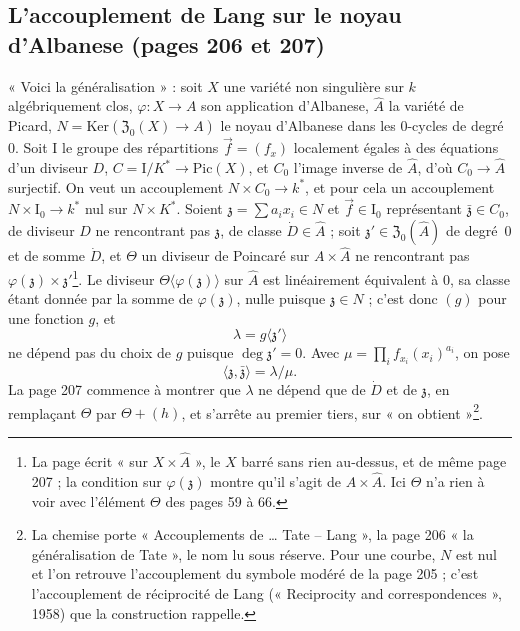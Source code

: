 \documentclass[11pt,a4paper]{article}
\begin{document}
\subsection*{L'accouplement de Lang sur le noyau d'Albanese (pages 206 et 207)}

« Voici la généralisation » : soit $X$ une variété non singulière sur $k$
algébriquement clos, $\varphi : X \to A$ son application d'Albanese, $\hat A$ la
variété de Picard, $N = \mathrm{Ker}(\mathfrak{Z}_0(X) \to A)$ le noyau d'Albanese
dans les $0$-cycles de degré~$0$. Soit $\mathrm{I}$ le groupe des répartitions
$\vec f = (f_x)$ localement égales à des équations d'un diviseur $D$, $C =
\mathrm{I}/K^{*} \to \mathrm{Pic}(X)$, et $C_0$ l'image inverse de $\hat A$, d'où
$C_0 \to \hat A$ surjectif. On veut un accouplement $N \times C_0 \to k^{*}$, et pour
cela un accouplement $N \times \mathrm{I}_0 \to k^{*}$ nul sur $N \times K^{*}$.
Soient $\mathfrak{z} = \sum a_i x_i \in N$ et $\vec f \in \mathrm{I}_0$ représentant
$\bar{\mathfrak{z}} \in C_0$, de diviseur $D$ ne rencontrant pas $\mathfrak{z}$, de
classe $\dot D \in \hat A$ ; soit $\mathfrak{z}' \in \mathfrak{Z}_0(\hat A)$ de
degré~$0$ et de somme $\dot D$, et $\Theta$ un diviseur de Poincaré sur
$A \times \hat A$ ne rencontrant pas $\varphi(\mathfrak{z}) \times
\mathfrak{z}'$\footnote{La page écrit « sur $X \times \hat A$ », le $X$ barré sans
rien au-dessus, et de même page 207 ; la condition sur $\varphi(\mathfrak{z})$
montre qu'il s'agit de $A \times \hat A$. Ici $\Theta$ n'a rien à voir avec
l'élément $\Theta$ des pages 59 à 66.}. Le diviseur $\Theta\langle
\varphi(\mathfrak{z}) \rangle$ sur $\hat A$ est linéairement équivalent à $0$, sa
classe étant donnée par la somme de $\varphi(\mathfrak{z})$, nulle puisque
$\mathfrak{z} \in N$ ; c'est donc $(g)$ pour une fonction $g$, et
\[
\lambda = g\langle \mathfrak{z}' \rangle
\]
ne dépend pas du choix de $g$ puisque $\deg \mathfrak{z}' = 0$. Avec $\mu = \prod_i
f_{x_i}(x_i)^{a_i}$, on pose
\[
\langle \mathfrak{z}, \bar{\mathfrak{z}} \rangle = \lambda/\mu.
\]
La page 207 commence à montrer que $\lambda$ ne dépend que de $\dot D$ et de
$\mathfrak{z}$, en remplaçant $\Theta$ par $\Theta + (h)$, et s'arrête au premier
tiers, sur « on obtient »\footnote{La chemise porte « Accouplements de … Tate --
Lang », la page 206 « la généralisation de Tate », le nom lu sous réserve. Pour
une courbe, $N$ est nul et l'on retrouve l'accouplement du symbole modéré de la
page 205 ; c'est l'accouplement de réciprocité de Lang (« Reciprocity and
correspondences », 1958) que la construction rappelle.}.
\end{document}
